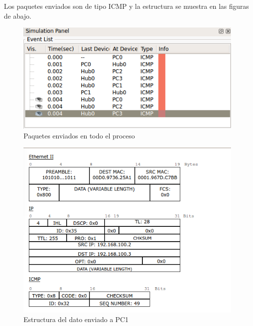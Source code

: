 \documentclass[a4paper,12pt]{article}
\begin{document}
\begin{enumerate}
\begin{itemize}
   Los paquetes enviados son de tipo ICMP y la estructura se muestra en las figuras de abajo.
   \begin{figure}[H]
    \centering
    \includegraphics[scale = 0.5]{9.png}
    \caption{Paquetes enviados en todo el proceso}
   \end{figure}
   \begin{figure}[H]
    \centering
    \includegraphics[scale = 0.5]{10.png}
    \caption{Estructura del dato enviado a PC1}
   \end{figure}
   \begin{figure}[H]
    \centering

\end{figure}
\end{itemize}
\end{enumerate}
\end{document}
